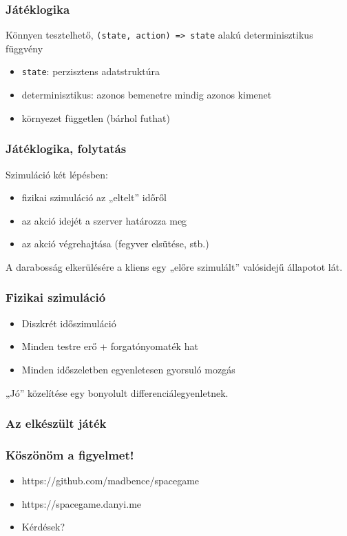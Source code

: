 \documentclass[xetex,14pt]{beamer}
\begin{document}
  \begin{frame}
    \frametitle{Játéklogika}
    Könnyen tesztelhető, \texttt{(state, action) => state} alakú determinisztikus függvény
    \begin{itemize}
      \item \texttt{state}: perzisztens adatstruktúra
      \item determinisztikus: azonos bemenetre mindig azonos kimenet
      \item környezet független (bárhol futhat)
    \end{itemize}
  \end{frame}
  \begin{frame}
    \frametitle{Játéklogika, folytatás}
    Szimuláció két lépésben:
    \begin{itemize}
      \item fizikai szimuláció az „eltelt” időről
      \item az akció idejét a szerver határozza meg
      \item az akció végrehajtása (fegyver elsütése, stb.)
    \end{itemize}
    \vfill
    A darabosság elkerülésére a kliens egy „előre szimulált” valósidejű állapotot lát.
  \end{frame}
  \begin{frame}
    \frametitle{Fizikai szimuláció}
    \begin{itemize}
      \item Diszkrét időszimuláció
      \item Minden testre erő + forgatónyomaték hat
      \item Minden időszeletben egyenletesen gyorsuló mozgás
    \end{itemize}
    „Jó” közelítése egy bonyolult differenciálegyenletnek.
  \end{frame}
  \begin{frame}
    \frametitle{Az elkészült játék}
  \end{frame}
  \begin{frame}
    \frametitle{Köszönöm a figyelmet!}
    \begin{itemize}
      \item https://github.com/madbence/spacegame
      \item https://spacegame.danyi.me
      \item Kérdések?
    \end{itemize}
  \end{frame}
\end{document}
